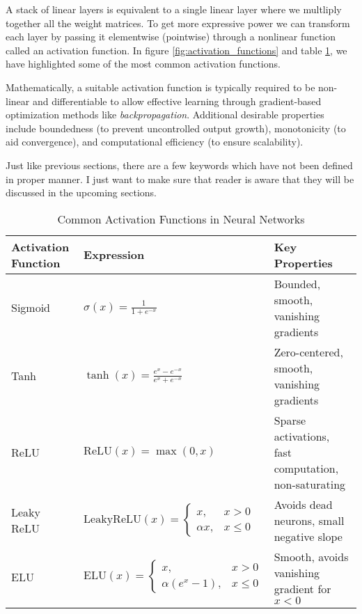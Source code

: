 A stack of linear layers is equivalent to a single linear layer where we multliply together all the weight matrices. To get more expressive power we can transform each layer by passing it elementwise (pointwise) through a nonlinear function called an activation function. In figure \ref{fig:activation_functions} and table \ref{tab:activation_functions}, we have highlighted some of the most common activation functions.

Mathematically, a suitable activation function is typically required to be non-linear and differentiable to allow effective learning through gradient-based optimization methods like \textit{backpropagation}. Additional desirable properties include boundedness (to prevent uncontrolled output growth), monotonicity (to aid convergence), and computational efficiency (to ensure scalability).

Just like previous sections, there are a few keywords which have not been defined in proper manner. I just want to make sure that reader is aware that they will be discussed in the upcoming sections.

\begin{table}[t]
    \centering
    \caption{Common Activation Functions in Neural Networks}
    \renewcommand{\arraystretch}{1.5} %
    \begin{tabular}{|>{\centering\arraybackslash}m{3.5cm}|>{\centering\arraybackslash}m{5.5cm}|>{\centering\arraybackslash}m{5.5cm}|}
    \hline
    \textbf{Activation Function} & \textbf{Expression} & \textbf{Key Properties} \\
    \hline
    Sigmoid & 
    $\displaystyle \sigma(x) = \frac{1}{1 + e^{-x}}$ & 
    Bounded, smooth, vanishing gradients \\
    \hline
    Tanh & 
    $\displaystyle \tanh(x) = \frac{e^x - e^{-x}}{e^x + e^{-x}}$ & 
    Zero-centered, smooth, vanishing gradients \\
    \hline
    ReLU & 
    $\displaystyle \text{ReLU}(x) = \max(0, x)$ & 
    Sparse activations, fast computation, non-saturating \\
    \hline
    Leaky ReLU & 
    $\displaystyle \text{LeakyReLU}(x) = \begin{cases}
    x, & x > 0 \\
    \alpha x, & x \leq 0
    \end{cases}$ & 
    Avoids dead neurons, small negative slope \\
    \hline
    ELU & 
    $\displaystyle \text{ELU}(x) = \begin{cases}
    x, & x > 0 \\
    \alpha(e^x - 1), & x \leq 0
    \end{cases}$ & 
    Smooth, avoids vanishing gradient for $x < 0$ \\
    \hline
    \end{tabular}
    \label{tab:activation_functions}
\end{table}


